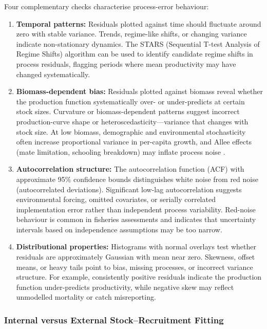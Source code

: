 \documentclass[11pt,a4paper]{article}
\begin{document}
Four complementary checks characterise process-error behaviour:

\begin{enumerate}
  \item \textbf{Temporal patterns:} Residuals plotted against time should fluctuate around zero with stable variance. Trends, regime-like shifts, or changing variance indicate non-stationary dynamics. The STARS (Sequential T-test Analysis of Regime Shifts) algorithm \citep{rodionov2004sequential} can be used to identify candidate regime shifts in process residuals, flagging periods where mean productivity may have changed systematically.

  \item \textbf{Biomass-dependent bias:} Residuals plotted against biomass reveal whether the production function systematically over- or under-predicts at certain stock sizes. Curvature or biomass-dependent patterns suggest incorrect production-curve shape or heteroscedasticity---variance that changes with stock size. At low biomass, demographic and environmental stochasticity often increase proportional variance in per-capita growth, and Allee effects (mate limitation, schooling breakdown) may inflate process noise \citep{clark2004population}.

  \item \textbf{Autocorrelation structure:} The autocorrelation function (ACF) with approximate 95\% confidence bounds distinguishes white noise from red noise (autocorrelated deviations). Significant low-lag autocorrelation suggests environmental forcing, omitted covariates, or serially correlated implementation error rather than independent process variability. Red-noise behaviour is common in fisheries assessments and indicates that uncertainty intervals based on independence assumptions may be too narrow.

  \item \textbf{Distributional properties:} Histograms with normal overlays test whether residuals are approximately Gaussian with mean near zero. Skewness, offset means, or heavy tails point to bias, missing processes, or incorrect variance structure. For example, consistently positive residuals indicate the production function under-predicts productivity, while negative skew may reflect unmodelled mortality or catch misreporting.
\end{enumerate}

\subsubsection{Internal versus External Stock--Recruitment Fitting}
\end{document}
